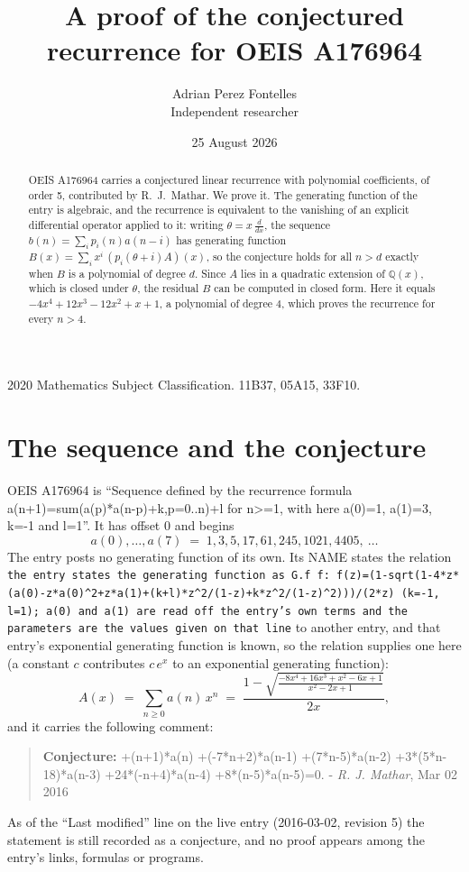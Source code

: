 \documentclass[11pt,a4paper]{article}
\title{A proof of the conjectured recurrence for OEIS A176964}
\author{Adrian Perez Fontelles\\ \small Independent researcher}
\date{25 August 2026}
\theoremstyle{plain}
\theoremstyle{definition}
\begin{document}
\maketitle

\begin{abstract}
OEIS A176964 carries a conjectured linear recurrence with polynomial coefficients, of
order 5, contributed by R.~J.~Mathar. We prove it. The generating function of the
entry is algebraic, and the recurrence is equivalent to the vanishing of an explicit
differential operator applied to it: writing $\theta=x\,\frac{d}{dx}$, the sequence
$b(n)=\sum_{i}p_{i}(n)a(n-i)$ has generating function
$B(x)=\sum_{i}x^{i}\,(p_{i}(\theta+i)A)(x)$, so the conjecture holds for all $n>d$ exactly
when $B$ is a polynomial of degree $d$. Since $A$ lies in a quadratic extension of
$\mathbb{Q}(x)$, which is closed under $\theta$, the residual $B$ can be computed in
closed form. Here it equals $- 4 x^{4} + 12 x^{3} - 12 x^{2} + x + 1$, a polynomial of degree $4$, which proves
the recurrence for every $n>4$.
\end{abstract}

\noindent\small 2020 Mathematics Subject Classification. 11B37, 05A15, 33F10.\normalsize

\section{The sequence and the conjecture}

OEIS A176964 is ``Sequence defined by the recurrence formula a(n+1)=sum(a(p)*a(n-p)+k,p=0..n)+l for n>=1, with here a(0)=1, a(1)=3, k=-1 and l=1''. It has offset $0$ and begins
\[
a(0),\dots,a(7)\;=\;1, 3, 5, 17, 61, 245, 1021, 4405,\ \dots
\]
The entry posts no generating function of its own. Its NAME states the
relation \texttt{the entry states the generating function as G.f f: f(z)=(1-sqrt(1-4*z*(a(0)-z*a(0)\textasciicircum{}2+z*a(1)+(k+l)*z\textasciicircum{}2/(1-z)+k*z\textasciicircum{}2/(1-z)\textasciicircum{}2)))/(2*z) (k=-1, l=1); a(0) and a(1) are read off the entry's own terms and the parameters are the values given on that line} to another entry, and that entry's exponential generating
function is known, so the relation supplies one here (a constant $c$ contributes
$c\,e^{x}$ to an exponential generating function):
\begin{equation}\label{eq:gf}
A(x)\;=\;\sum_{n\ge 0} a(n)\,x^{n}\;=\;\frac{1 - \sqrt{\frac{- 8 x^{4} + 16 x^{3} + x^{2} - 6 x + 1}{x^{2} - 2 x + 1}}}{2 x} ,
\end{equation}
and it carries the following comment:
\begin{quote}\small
\textbf{Conjecture:} +(n+1)*a(n) +(-7*n+2)*a(n-1) +(7*n-5)*a(n-2) +3*(5*n-18)*a(n-3) +24*(-n+4)*a(n-4) +8*(n-5)*a(n-5)=0. - \emph{R. J. Mathar}, Mar 02 2016
\end{quote}
As of the ``Last modified'' line on the live entry (2016-03-02, revision 5) the
statement is still recorded as a conjecture, and no proof appears among the entry's links,
formulas or programs.
\end{document}
